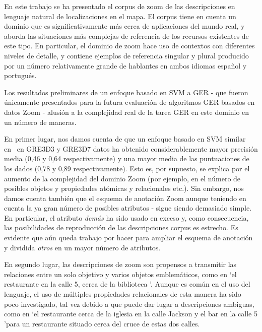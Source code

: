 
En este trabajo se ha presentado el corpus de zoom de las descripciones en lenguaje natural de localizaciones en el mapa. El corpus tiene en cuenta un dominio que es significativamente m\'as cerca de aplicaciones del mundo real, y aborda las situaciones m\'as complejas de referencia de los recursos existentes de este tipo. En particular, el dominio de zoom hace uso de contextos con diferentes niveles de detalle, y contiene ejemplos de referencia singular y plural producido por un n\'umero relativamente grande de hablantes en ambos idiomas espa\~nol y portugu\'es.

Los resultados preliminares de un enfoque basado en SVM a GER - que fueron \'unicamente presentados para la futura evaluaci\'on de algoritmos GER basados en datos Zoom - alusi\'on a la complejidad real de la tarea GER en este dominio en un n\'umero de maneras.

En primer lugar, nos damos cuenta de que un enfoque basado en SVM similar en~\cite{thiago-svm} en GRE3D3 y GRE3D7 datos ha obtenido considerablemente mayor precisi\'on media (0,46 y 0,64 respectivamente) y una mayor media de las puntuaciones de los dados (0,78 y 0,89 respectivamente). Esto es, por supuesto, se explica por el aumento de la complejidad del dominio Zoom (por ejemplo, en el n\'umero de posibles objetos y propiedades at\'omicas y relacionales etc.). Sin embargo, nos damos cuenta tambi\'en que el esquema de anotaci\'on Zoom \- aunque teniendo en cuenta la ya gran n\'umero de posibles atributos - sigue siendo demasiado simple. En particular, el atributo {\em dem\'as} ha sido usado en exceso y, como consecuencia, las posibilidades de reproducci\'on de las descripciones corpus es estrecho. Es evidente que a\'un queda trabajo por hacer para ampliar el esquema de anotaci\'on y dividida {\em otros} en un mayor n\'umero de atributos.

En segundo lugar, las descripciones de zoom son propensos a transmitir las relaciones entre un solo objetivo y varios objetos emblem\'aticos, como en `el restaurante en la calle 5, cerca de la biblioteca '. Aunque es com\'un en el uso del lenguaje, el uso de m\'ultiples propiedades relacionales de esta manera ha sido poco investigado, tal vez debido a que puede dar lugar a descripciones ambiguas, como en `el restaurante cerca de la iglesia en la calle Jackson y el bar en la calle 5 'para un restaurante situado cerca del cruce de estas dos calles.

